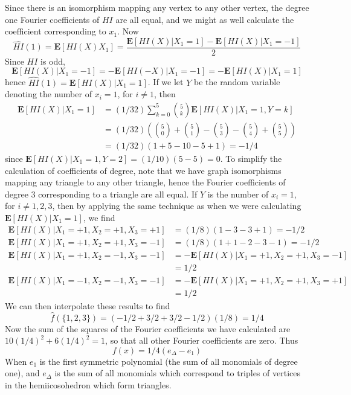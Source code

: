 \begin{example}
    Since there is an isomorphism mapping any vertex to any other vertex, the degree one Fourier coefficients of $HI$ are all equal, and we might as well calculate the coefficient corresponding to $x_1$. Now
    \[ \widehat{HI}(1) = \mathbf{E}[HI(X)X_1] = \frac{\mathbf{E}[HI(X) | X_1 = 1] - \mathbf{E}[HI(X) | X_1 = -1]}{2} \]
    Since $HI$ is odd,
    \[ \mathbf{E}[HI(X) | X_1 = -1] = -\mathbf{E}[HI(-X) | X_1 = -1] = -\mathbf{E}[HI(X) | X_1 = 1] \]
    hence $\widehat{HI}(1) = \mathbf{E}[HI(X) | X_1 = 1]$. If we let $Y$ be the random variable denoting the number of $x_i = 1$, for $i \neq 1$, then
    \begin{align*}
        \mathbf{E}[HI(X) | X_1 = 1] &= (1/32) \sum_{k = 0}^5 {5 \choose k} \mathbf{E}[HI(X)|X_1 = 1, Y = k]\\
        &= (1/32) \left( {5 \choose 0} + {5 \choose 1} - {5 \choose 3} - {5 \choose 4} + {5 \choose 5} \right)\\
        &= (1/32)(1 + 5 - 10 - 5 + 1) = -1/4
    \end{align*}
    since $\mathbf{E}[HI(X) | X_1 = 1, Y = 2] = (1/10)(5 - 5) = 0$. To simplify the calculation of coefficients of degree, note that we have graph isomorphisms mapping any triangle to any other triangle, hence the Fourier coefficients of degree 3 corresponding to a triangle are all equal. If $Y$ is the number of $x_i = 1$, for $i \neq 1,2,3$, then by applying the same technique as when we were calculating $\mathbf{E}[HI(X) | X_1 = 1]$, we find
    \begin{align*}
        \mathbf{E}[HI(X) | X_1 = +1, X_2 = +1, X_3 = +1] &= (1/8)(1 - 3 - 3 + 1) = -1/2\\
        \mathbf{E}[HI(X) | X_1 = +1, X_2 = +1, X_3 = -1] &= (1/8)(1 + 1 - 2 - 3 - 1) = -1/2\\
        \mathbf{E}[HI(X) | X_1 = +1, X_2 = -1, X_3 = -1] &=  -\mathbf{E}[HI(X) | X_1 = +1, X_2 = +1, X_3 = -1]\\
        &= 1/2\\
        \mathbf{E}[HI(X) | X_1 = -1, X_2 = -1, X_3 = -1] &= - \mathbf{E}[HI(X) | X_1 = +1, X_2 = +1, X_3 = +1]\\
        &= 1/2
    \end{align*}
    We can then interpolate these results to find
    \[ \widehat{f}(\{ 1, 2, 3 \}) = (-1/2 + 3/2 + 3/2 - 1/2)(1/8) = 1/4 \]
    Now the sum of the squares of the Fourier coefficients we have calculated are $10(1/4)^2 + 6(1/4)^2 = 1$, so that all other Fourier coefficients are zero. Thus
    \[ f(x) = 1/4(e_\Delta - e_1) \]
    When $e_1$ is the first symmetric polynomial (the sum of all monomials of degree one), and $e_\Delta$ is the sum of all monomials which correspond to triples of vertices in the hemiicosohedron which form triangles.
\end{example}

